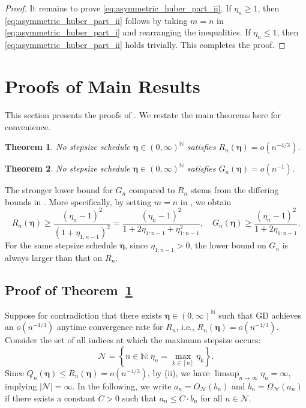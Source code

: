 \documentclass[11pt]{article}
\newcommand{\N}{\mathbb{N}}
\newcommand{\abs}[1]{\left\lvert#1\right\rvert}
\newcommand{\schedule}{\bm{\eta}}
\newtheorem{theorem}{Theorem}[section]
\begin{document}
\begin{proof}
It remains to prove \eqref{eq:asymmetric_huber_part_ii}.
If $\eta_n\geq 1$, then \eqref{eq:asymmetric_huber_part_ii} follows by taking $m=n$ in \eqref{eq:asymmetric_huber_part_i} and rearranging the inequalities.
If $\eta_n\leq 1$, then \eqref{eq:asymmetric_huber_part_ii} holds trivially.
This completes the proof.
\end{proof}



\section{Proofs of Main Results}\label{sec:lower_bounds}

This section presents the proofs of .
We restate the main theorems here for convenience.

\begin{theorem}\label{thm:function_value_impossibility_restate}
No stepsize schedule $\schedule\in(0,\infty)^{\N}$ satisfies $R_n(\schedule)=o(n^{-4/3})$.
\end{theorem}

\begin{theorem}\label{thm:gradient_norm_impossibility_restate}
No stepsize schedule $\schedule\in(0,\infty)^{\N}$ satisfies $G_n(\schedule)=o(n^{-1})$.
\end{theorem}

The stronger lower bound for $G_n$ compared to $R_n$ stems from the differing bounds in .
More specifically, by setting $m=n$ in , we obtain
\[
	R_n(\schedule) \geq \frac{ (\eta_n-1)^2 }{ ( 1 + \eta_{1:n-1} )^2}
    = \frac{ (\eta_n-1)^2 }{ 1 + 2\eta_{1:n-1} + \eta_{1:n-1}^2},
    \quad
	G_n(\schedule) \geq \frac{ (\eta_n-1)^2 }{ 1 + 2 \eta_{1:n-1} }.
\]
For the same stepsize schedule $\schedule$, since $\eta_{1:n-1}>0$, the lower bound on $G_n$ is always larger than that on $R_n$.



\subsection{Proof of Theorem~\ref{thm:function_value_impossibility_restate}}

Suppose for contradiction that there exists $\schedule\in(0,\infty)^{\N}$ such that GD achieves an $o(n^{-4/3})$ anytime convergence rate for $R_n$, i.e., $R_n(\schedule) = o( n^{-4/3} )$.
Consider the set of all indices at which the maximum stepsize occurs:
\[
	\mathcal{N} = \left\{ n\in\N: \eta_n = \max_{k\in[n]}\eta_k \right\}.
\]
Since $Q_n(\schedule)\leq R_n(\schedule) = o(n^{-4/3})$, by  (ii), we have $\limsup_{n\to\infty}\eta_n = \infty$, implying $\abs{\mathcal{N}}=\infty$.
In the following, we write $a_n=O_{\mathcal{N}}(b_n)$ and $b_n=\Omega_{\mathcal{N}}(a_n)$ if there exists a constant $C>0$ such that $a_n\leq C\cdot b_n$ for all $n\in\mathcal{N}$.
\end{document}
